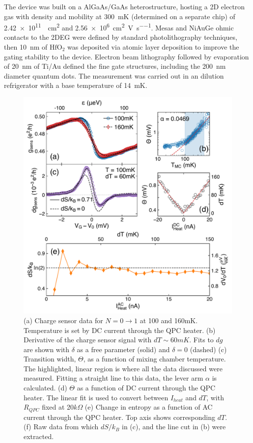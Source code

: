 \documentclass[twocolumn,showpacs,preprintnumbers,amsmath,amssymb,pra,aps,superscriptaddress]{revtex4-1}
\begin{document}
The device was built on a AlGaAs/GaAs heterostructure, hosting a 2D electron gas with density and mobility at \SI{300}{\milli\kelvin} (determined on a separate chip) of \SI{2.42e11}{\per\square\centi\metre} and \SI[per-mode=symbol]{2.56e6}{\square\centi\metre\per\volt\per\second}.   Mesas and NiAuGe ohmic contacts to the 2DEG were defined by standard photolithography techniques, then \SI{10}{\nano\metre} of $\mathrm{HfO_2}$ was deposited via atomic layer deposition to improve the gating stability to the device. Electron beam lithography followed by evaporation of \SI{20}{\nano\metre} of Ti/Au defined the fine gate structures, including the \SI{200}{\nano\metre} diameter quantum dots. The measurement was carried out in an dilution refrigerator with a base temperature of \SI{14}{\milli\kelvin}.


\begin{figure}[!]
        \includegraphics[width=1.0\columnwidth]{../figures/figure_2.pdf}
        \caption{\label{fig:fig2}(a) Charge sensor data for $N=0 \rightarrow 1$ at 100 and 160mK. Temperature is set by DC current through the QPC heater. (b) Derivative of the charge sensor signal with $dT \sim 60mK$. Fits to $dg$ are shown with $\delta$ as a free parameter (solid) and $\delta=0$ (dashed) (c) Transition width, $\Theta$, as a function of mixing chamber temperature. The highlighted, linear region is where all the data discussed were measured. Fitting a straight line to this data, the lever arm $\alpha$ is calculated. (d) $\Theta$ as a function of DC current through the QPC heater. The linear fit is used to convert between $I_{heat}$ and $dT$, with $R_{QPC}$ fixed at 20$k\Omega$ (e) Change in entropy as a function of AC current through the QPC heater. Top axis shows corresponding $dT$. (f) Raw data from which $dS / k_B$ in (c), and the line cut in (b) were extracted.}
\end{figure}
\end{document}

